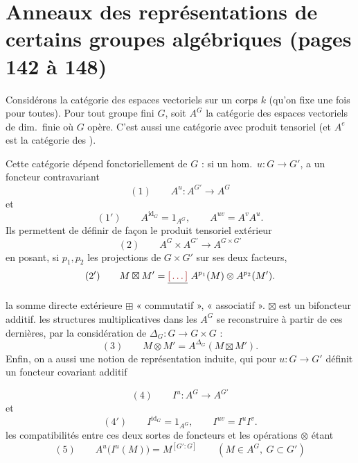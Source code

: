\documentclass[11pt,a4paper]{article}
\begin{document}
\section*{Anneaux des représentations de certains groupes algébriques (pages 142 à 148)}



Considérons la catégorie des espaces vectoriels  sur un corps
$k$ (qu'on fixe une fois pour toutes). Pour tout groupe fini $G$, soit $A^{G}$ la
catégorie des espaces vectoriels de dim.\ finie où $G$ opère. C'est aussi une
catégorie avec produit tensoriel  (et $A^{e}$ \ill{} est la
catégorie des \ill{}).


Cette catégorie dépend fonctoriellement de $G$ : si \ill{} un hom.\
$u : G \to G'$, \ill{} a un foncteur contravariant
\[ (1) \qquad A^{u} : A^{G'} \longrightarrow A^{G} \]
et
\[ (1') \qquad A^{\mathrm{id}_{G}} = 1_{A^{G}} , \qquad A^{uv} = A^{v} A^{u} . \]
\struck{Ces foncteurs sont \ill{}} Ils permettent de définir de façon \ill{} le
produit tensoriel extérieur
\[ (2) \qquad A^{G} \times A^{G'} \longrightarrow A^{G \times G'} \]
en posant, si $p_{1}, p_{2}$ \ill{} les projections de $G \times G'$ sur ses deux
facteurs,
\[ (2') \qquad M \boxtimes M' = \struck{\ill{}} \ A^{p_{1}}(M) \otimes A^{p_{2}}(M') . \]


\ill{} la somme directe extérieure $\boxplus$ \ill{} « commutatif »,
« associatif ». $\boxtimes$ est un bifoncteur additif. \ill{} les structures
multiplicatives dans les $A^{G}$ \ill{} se reconstruire à partir de ces
dernières, par \ill{} la considération de $\Delta_{G} : G \to G \times G$ :
\[ (3) \qquad M \otimes M' = A^{\Delta_{G}}(M \boxtimes M') . \]
Enfin, on a aussi une notion de représentation induite, qui pour \ill{}
$u : G \to G'$ définit un foncteur covariant additif


\[ (4) \qquad I^{u} : A^{G} \longrightarrow A^{G'} \]
et
\[ (4') \qquad I^{\mathrm{id}_{G}} = 1_{A^{G}} , \qquad I^{uv} = I^{u} I^{v} . \]
\ill{} les compatibilités entre ces deux sortes de foncteurs \struck{\ill{}} et
les opérations $\otimes$ étant
\[ (5) \qquad A^{u}\bigl(I^{u}(M)\bigr) = M^{[G' : G]} \qquad
   (M \in A^{G} , \ G \subset G') \]
\struck{\ill{}}
\end{document}
